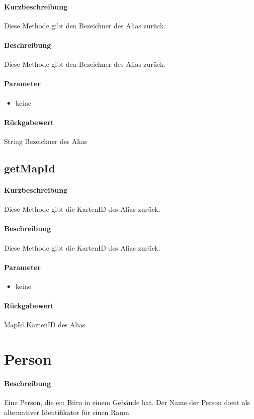 \paragraph*{Kurzbeschreibung}
Diese Methode gibt den Bezeichner des Alias zurück.
\paragraph*{Beschreibung}
Diese Methode gibt den Bezeichner des Alias zurück.
\paragraph*{Parameter}
\begin{itemize}
    \item keine
\end{itemize}
\paragraph*{Rückgabewert}
String Bezeichner des Alias

\subsection{getMapId}%
\paragraph*{Kurzbeschreibung}
Diese Methode gibt die KartenID des Alias zurück.
\paragraph*{Beschreibung}
Diese Methode gibt die KartenID des Alias zurück.
\paragraph*{Parameter}
\begin{itemize}
    \item keine
\end{itemize}
\paragraph*{Rückgabewert}
MapId KartenID des Alias


\section{Person}
\paragraph*{Beschreibung}
Eine Person, die ein Büro in einem Gebäude hat. Der Name der Person dient als alternativer Identifikator für einen Raum.
